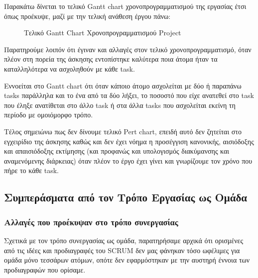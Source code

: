 \documentclass[12pt,a4paper]{article}
\begin{document}
Παρακάτω δίνεται το τελικό Gantt chart χρονοπρογραμματισμού της εργασίας έτσι όπως προέκυψε, μαζί με την τελική ανάθεση έργου πάνω:

\begin{figure}[H]
	\caption{Τελικό Gantt Chart Χρονοπρογραμματισμού Project}
	\label{Τελικό Gantt Chart Χρονοπρογραμματισμού Project}
\end{figure}

Παρατηρούμε λοιπόν ότι έγιναν και αλλαγές στον τελικό χρονοπρογραμματισμό, όταν πλέον στη πορεία της άσκησης εντοπίστηκε καλύτερα ποια άτομα ήταν τα καταλληλότερα να ασχοληθούν με κάθε task. 

Εννοείται στο Gantt chart ότι όταν κάποιο άτομο ασχολείται με δύο ή παραπάνω tasks παράλληλα και το ένα από τα δύο λήξει, το ποσοστό που είχε ανατεθεί στο task που έληξε ανατίθεται στο άλλο task ή στα άλλα tasks που ασχολείται εκείνη τη περίοδο με ομοιόμορφο τρόπο.

Τέλος σημειώνω πως δεν δίνουμε τελικό Pert chart, επειδή αυτό δεν ζητείται στο εγχειρίδιο της άσκησης καθώς και δεν έχει νόημα η προσέγγιση κανονικής, αισιόδοξης και απαισιόδοξης εκτίμησης (και προφανώς και υπολογισμός διακύμανσης και αναμενόμενης διάρκειας) όταν πλέον το έργο έχει γίνει και γνωρίζουμε τον χρόνο που πήρε το κάθε task.

\subsection{Συμπεράσματα από τον Τρόπο Εργασίας ως Ομάδα}

\subsubsection{Αλλαγές που προέκυψαν στο τρόπο συνεργασίας}
Σχετικά με τον τρόπο συνεργασίας ως ομάδα, παρατηρήσαμε αρχικά ότι ορισμένες από τις ιδέες και προδιαγραφές του SCRUM δεν μας φάνηκαν τόσο ωφέλιμες για ομάδα μόνο τεσσάρων ατόμων, οπότε δεν εφαρμόστηκαν με την αυστηρή έννοια των προδιαγραφών που ορίσαμε.
\end{document}
